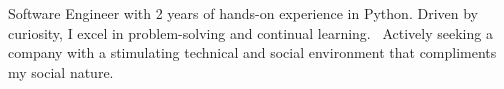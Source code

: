 
\begin{cvspacedparagraph}
    Software Engineer with 2 years of hands-on experience in Python. Driven by curiosity, I excel in problem-solving and continual learning. \
    Actively seeking a company with a stimulating technical and social environment that compliments my social nature.
\end{cvspacedparagraph}
